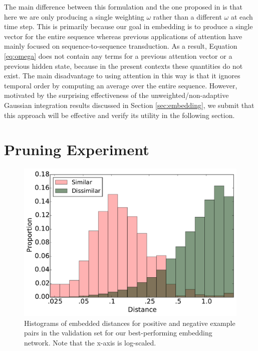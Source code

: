 \documentclass{article}
\begin{document}
The main difference between this formulation and the one proposed in \cite{bahdanau2014neural, cho2015describing} is that here we are only producing a single weighting $\omega$ rather than a different $\omega$ at each time step.
This is primarily because our goal in embedding is to produce a single vector for the entire sequence whereas previous applications of attention have mainly focused on sequence-to-sequence transduction.
As a result, Equation \ref{eq:omega} does not contain any terms for a previous attention vector or a previous hidden state, because in the present contexts these quantities do not exist.
The main disadvantage to using attention in this way is that it ignores temporal order by computing an average over the entire sequence.
However, motivated by the surprising effectiveness of the unweighted/non-adaptive Gaussian integration results discussed in Section \ref{sec:embedding}, we submit that this approach will be effective and verify its utility in the following section.

\section{Pruning Experiment}
\label{sec:experiment}

\begin{figure}[t]
  \centering
  \includegraphics[width=\columnwidth]{distances.pdf}
  \caption{Histograms of embedded distances for positive and negative example pairs in the validation set for our best-performing embedding network.  Note that the x-axis is log-scaled.}
  \label{fig:distances}
\end{figure}
\end{document}
